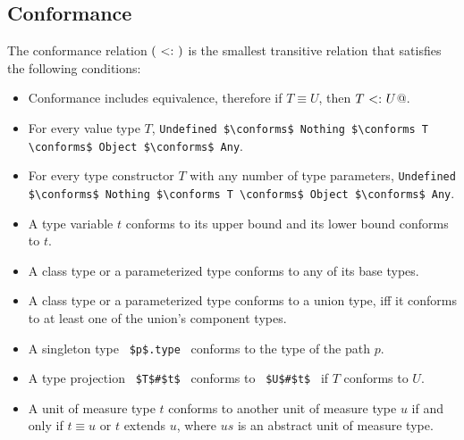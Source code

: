 \subsection{Conformance}
\label{sec:conformance}

The conformance relation $(\conforms)$ is the smallest transitive relation that satisfies the following conditions:

\begin{itemize}

  \item Conformance includes equivalence, therefore if $T \equiv U$, then \lstinline@$T \conforms U$@. 

  \item For every value type $T$, \lstinline!Undefined $\conforms$ Nothing $\conforms T \conforms$ Object $\conforms$ Any!. 
 
  \item For every type constructor $T$ with any number of type parameters, \lstinline!Undefined $\conforms$ Nothing $\conforms T \conforms$ Object $\conforms$ Any!. 

  \item A type variable $t$ conforms to its upper bound and its lower bound conforms to $t$. 

  \item A class type or a parameterized type conforms to any of its base types. 

  \item A class type or a parameterized type conforms to a union type, iff it conforms to at least one of the union's component types. 

  \item  A singleton type ~\lstinline!$p$.type!~ conforms to the type of the path $p$.

  \item A type projection ~\lstinline!$T$#$t$!~ conforms to ~\lstinline!$U$#$t$!~ if $T$ conforms to $U$. 

  \item A unit of measure type $t$ conforms to another unit of measure type $u$ if and only if $t \equiv u$ or $t$ extends $u$, where $us$ is an abstract unit of measure type. 


\end{itemize}
